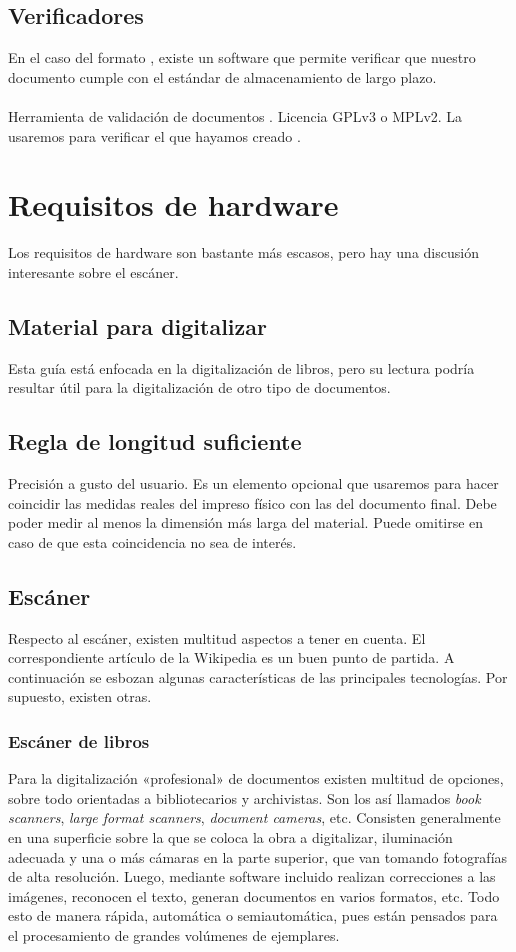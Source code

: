 \documentclass[%
	a5paper,
	10pt,
	twoside,
	openright,
	final,
]{memoir}
\begin{document}
{	\subsection{Verificadores} En el caso del formato \pdf, existe un software que permite verificar que nuestro documento cumple con el estándar \pdfa de almacenamiento de largo plazo.
	\paragraph{\veraPDF} Herramienta de validación de documentos \pdfa. Licencia GPLv3 o MPLv2. La usaremos para verificar el \pdfa que hayamos creado \cite{veraPDF}.

	\section{Requisitos de hardware} Los requisitos de hardware son bastante más escasos, pero hay una discusión interesante sobre el escáner.
	\subsection{Material para digitalizar} Esta guía está enfocada en la digitalización de libros, pero su lectura podría resultar útil para la digitalización de otro tipo de documentos.
	\subsection{Regla de longitud suficiente} Precisión a gusto del usuario. Es un elemento opcional que usaremos para hacer coincidir las medidas reales del impreso físico con las del documento final. Debe poder medir al menos la dimensión más larga del material. Puede omitirse en caso de que esta coincidencia no sea de interés.

	\subsection{Escáner} Respecto al escáner, existen multitud aspectos a tener en cuenta. El correspondiente artículo de la Wikipedia \cite{WikipediaImageScanner} es un buen punto de partida. A continuación se esbozan algunas características de las principales tecnologías. Por supuesto, existen otras.
	\subsubsection{Escáner de libros} Para la digitalización «profesional» de documentos existen multitud de opciones, sobre todo orientadas a bibliotecarios y archivistas. Son los así llamados \emph{book scanners}, \emph{large format scanners}, \emph{document cameras}, etc. Consisten generalmente en una superficie sobre la que se coloca la obra a digitalizar, iluminación adecuada y una o más cámaras en la parte superior, que van tomando fotografías de alta resolución. Luego, mediante software incluido realizan correcciones a las imágenes, reconocen el texto, generan documentos en varios formatos, etc. Todo esto de manera rápida, automática o semiautomática, pues están pensados para el procesamiento de grandes volúmenes de ejemplares.

}
\end{document}
